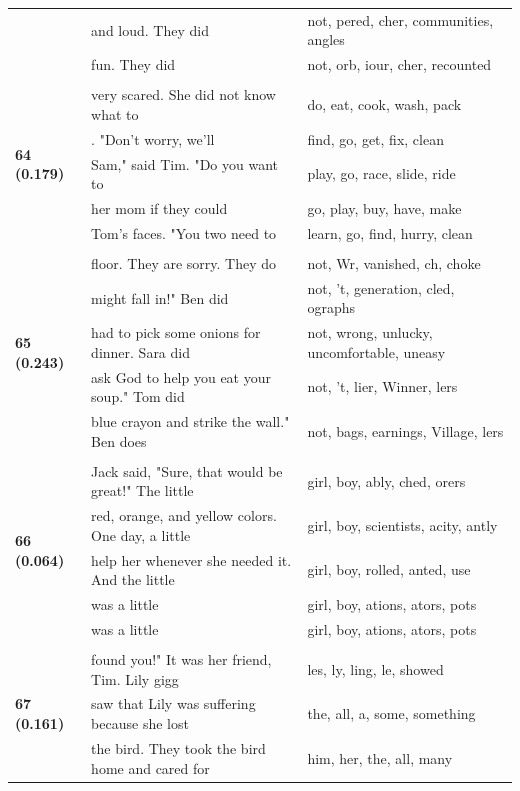 \documentclass{article}
\theoremstyle{plain}
\theoremstyle{definition}
\theoremstyle{remark}
\begin{document}
\begin{longtable}{|p{}|p{}|p{}|}
& and loud. They did & not, pered, cher,  communities, angles \\
& fun. They did & not,  orb, iour, cher,  recounted \\
& & \\
\multirow{5}{*}{\textbf{64 (0.179)}} & very scared. She did not know what to & do,  eat,  cook,  wash,  pack \\
& . "Don't worry, we'll & find,  go,  get,  fix,  clean \\
& Sam," said Tim. "Do you want to & play,  go,  race,  slide,  ride \\
& her mom if they could & go,  play,  buy,  have,  make \\
& Tom's faces.  "You two need to & learn,  go,  find,  hurry,  clean \\
& & \\
\multirow{5}{*}{\textbf{65 (0.243)}} & floor. They are sorry. They do & not, Wr,  vanished, ch,  choke \\
& might fall in!"  Ben did & not, 't,  generation, cled, ographs \\
& had to pick some onions for dinner. Sara did & not,  wrong,  unlucky,  uncomfortable,  uneasy \\
& ask God to help you eat your soup."  Tom did & not, 't, lier, Winner, lers \\
& blue crayon and strike the wall."  Ben does & not, bags,  earnings,  Village, lers \\
& & \\
\multirow{5}{*}{\textbf{66 (0.064)}} & Jack said, "Sure, that would be great!" The little & girl,  boy, ably, ched, orers \\
& red, orange, and yellow colors. One day, a little & girl,  boy,  scientists, acity, antly \\
& help her whenever she needed it. And the little & girl,  boy, rolled, anted, use \\
& was a little & girl,  boy, ations, ators, pots \\
& was a little & girl,  boy, ations, ators, pots \\
& & \\
\multirow{5}{*}{\textbf{67 (0.161)}} & found you!" It was her friend, Tim.   Lily gigg & les, ly, ling, le,  showed \\
& saw that Lily was suffering because she lost & the,  all,  a,  some,  something \\
& the bird. They took the bird home and cared for & him,  her,  the,  all,  many \\

\end{longtable}
\end{document}
